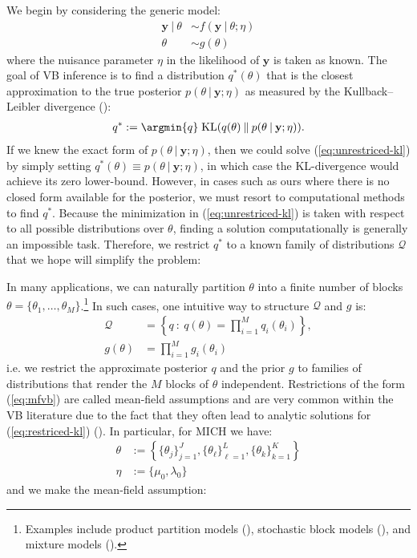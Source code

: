 We begin by considering the generic model:
\begin{align}
    \mathbf{y} \:|\: \theta &\sim f(\mathbf{y}\:|\: \theta;\eta) \\
    \theta &\sim g(\theta)
\end{align}
where the nuisance parameter $\eta$ in the likelihood of $\mathbf{y}$ is taken as known. The goal of VB inference is to find a distribution $q^*(\theta)$ that is the closest approximation to the true posterior $p(\theta\:|\: \mathbf{y};\eta)$ as measured by the Kullback–Leibler divergence (\citealp{Kullback51}):
\begin{align}\label{eq:unrestriced-kl}
    q^* := \argmin{q}  \; \text{KL}( q(\theta) \:\lVert\: p(\theta\:|\: \mathbf{y};\eta)).
\end{align}
If we knew the exact form of $p(\theta\:|\: \mathbf{y};\eta)$, then we could solve (\ref{eq:unrestriced-kl}) by simply setting $q^*(\theta)\equiv p(\theta\:|\: \mathbf{y};\eta)$, in which case the KL-divergence would achieve its zero lower-bound. However, in cases such as ours where there is no closed form available for the posterior, we must resort to computational methods to find $q^*$. Because the minimization in (\ref{eq:unrestriced-kl}) is taken with respect to all possible distributions over $\theta$, finding a solution computationally is generally an impossible task. Therefore, we restrict $q^*$ to a known family of distributions $\mathcal{Q}$ that we hope will simplify the problem:

In many applications, we can naturally partition $\theta$ into a finite number of blocks $\theta = \{\theta_1, \ldots, \theta_M\}$.\footnote{Examples include product partition models (\citealp{Hartigan90, Barry92}), stochastic block models (\citealp{Holland83}), and mixture models (\citealp{Corduneanu01}).} In such cases, one intuitive way to structure $\mathcal{Q}$ and $g$ is:
\begin{align} 
    \mathcal{Q} &= \left\{q \::\: q(\theta) = \prod_{i=1}^M q_i(\theta_i)\right\}, \label{eq:mfvb} \\
    g(\theta) &= \prod_{i=1}^M g_i(\theta_i) \label{eq:ind-prior}
\end{align}
i.e. we restrict the approximate posterior $q$ and the prior $g$ to families of distributions that render the $M$ blocks of $\theta$ independent. Restrictions of the form (\ref{eq:mfvb}) are called mean-field assumptions and are very common within the VB literature due to the fact that they often lead to analytic solutions for (\ref{eq:restriced-kl}) (\citealp{Wainwright08}). In particular, for MICH we have:
\begin{align}
    \theta &:= \left\{\{\theta_j\}_{j=1}^J, \{\theta_\ell\}_{\ell=1}^L,\{\theta_k\}_{k=1}^K\right\} \\
    \eta &:= \{\mu_0,\lambda_0\}
\end{align}
and we make the mean-field assumption:

